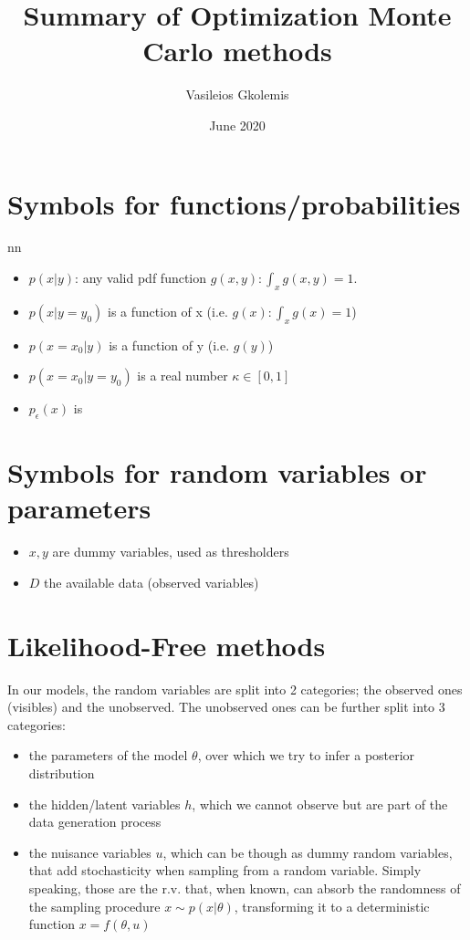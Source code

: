 \documentclass{article}
\title{Summary of Optimization Monte Carlo methods}
\author{Vasileios Gkolemis}
\date{June 2020}
\begin{document}
\maketitle

\section{Symbols for functions/probabilities}

nn\begin{itemize}
    \item $p(x|y)$: any valid pdf function $g(x,y): \int_x g(x,y) = 1$. 
    \item $p(x|y=y_0)$ is a function of x (i.e. $g(x): \int_x g(x) = 1$)  
    \item $p(x=x_0|y)$ is a function of y (i.e. $g(y)$) 
    \item $p(x=x_0|y=y_0)$ is a real number $\kappa \in [0,1]$
    \item $p_\epsilon(x)$ is 
\end{itemize}

\section{Symbols for random variables or parameters}

\begin{itemize}
    \item $x, y$ are dummy variables, used as thresholders
    \item $D$ the available data (observed variables)
\end{itemize}



\section{Likelihood-Free methods}

In our models, the random variables are split into 2 categories; the observed ones (visibles) and the unobserved. The unobserved ones can be further split into 3 categories:

\begin{itemize}
    \item the parameters of the model $\theta$, over which we try to infer a posterior distribution
    \item the hidden/latent variables $h$, which we cannot observe but are part of the data generation process
    \item the nuisance variables $u$, which can be though as dummy random variables, that add stochasticity when sampling from a random variable. Simply speaking, those are the r.v. that, when known, can absorb the randomness of the sampling procedure $x \sim p(x|\theta)$, transforming it to a deterministic function $x = f(\theta, u)$
\end{itemize}
\end{document}
